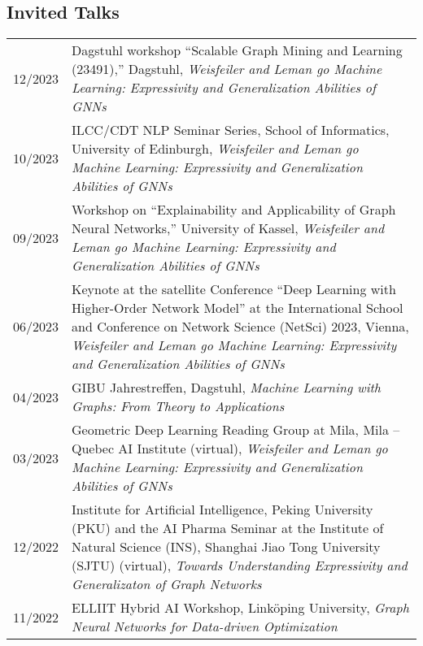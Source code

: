 \documentclass[11pt, a4paper, DIV=14, headings=small]{scrartcl}
\begin{document}
	\subsection*{Invited Talks}
	\begin{longtabu}{p{2.1cm}p{12.0cm}}
		12/2023 & Dagstuhl workshop ``Scalable Graph Mining and Learning (23491),'' Dagstuhl, \emph{Weisfeiler and Leman go Machine Learning: Expressivity and Generalization Abilities of GNNs}                                                                                                \\
		10/2023 & ILCC/CDT NLP Seminar Series, School of Informatics, University of Edinburgh, \emph{Weisfeiler and Leman go Machine Learning: Expressivity and Generalization Abilities of GNNs}\\    
		09/2023 & Workshop on ``Explainability and Applicability of Graph Neural Networks,'' University of Kassel, \emph{Weisfeiler and Leman go Machine Learning: Expressivity and Generalization Abilities of GNNs} \\
		06/2023 & Keynote at the satellite Conference ``Deep Learning with Higher-Order Network Model'' at the International School
		and Conference on Network Science (NetSci) 2023, Vienna, \emph{Weisfeiler and Leman go Machine Learning: Expressivity and Generalization Abilities of GNNs}\\                                                                                                                     
		04/2023 & GIBU Jahrestreffen, Dagstuhl, \emph{Machine Learning with Graphs: From Theory to Applications}                                                                                                                                                                                \\
		03/2023 & Geometric Deep Learning Reading Group at Mila, Mila -- Quebec AI Institute (virtual), \emph{Weisfeiler and Leman go Machine Learning: Expressivity and Generalization Abilities of GNNs}\\
		12/2022 & Institute for Artificial Intelligence, Peking University (PKU) and the AI Pharma Seminar at the Institute of Natural Science (INS), Shanghai Jiao Tong University (SJTU) (virtual), \emph{Towards Understanding Expressivity and Generalizaton of Graph Networks}            \\
		11/2022 & ELLIIT Hybrid AI Workshop, Linköping University, \emph{Graph Neural Networks for Data-driven Optimization}                                                                                                                                                                    \\

\end{longtabu}
\end{document}
